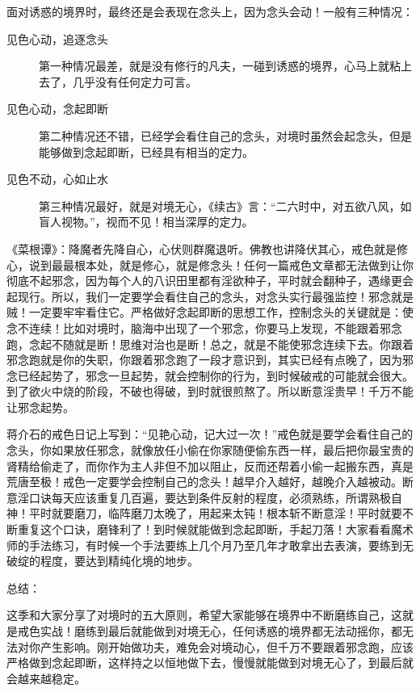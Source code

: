 面对诱惑的境界时，最终还是会表现在念头上，因为念头会动！一般有三种情况：

\begin{description}
    \item[见色心动，追逐念头] 第一种情况最差，就是没有修行的凡夫，一碰到诱惑的境界，心马上就粘上去了，几乎没有任何定力可言。
    \item[见色心动，念起即断] 第二种情况还不错，已经学会看住自己的念头，对境时虽然会起念头，但是能够做到念起即断，已经具有相当的定力。
    \item[见色不动，心如止水] 第三种情况最好，就是对境无心，《续古》言：“二六时中，对五欲八风，如盲人视物。”，视而不见！相当深厚的定力。
\end{description}

《菜根谭》：降魔者先降自心，心伏则群魔退听。佛教也讲降伏其心，戒色就是修心，说到最最根本处，就是修心，就是修念头！任何一篇戒色文章都无法做到让你彻底不起邪念，因为每个人的八识田里都有淫欲种子，平时就会翻种子，遇缘更会起现行。所以，我们一定要学会看住自己的念头，对念头实行最强监控！邪念就是贼！一定要牢牢看住它。严格做好念起即断的思想工作，控制念头的关键就是：使念不连续！比如对境时，脑海中出现了一个邪念，你要马上发现，不能跟着邪念跑，念起不随就是断！思维对治也是断！总之，就是不能使邪念连续下去。你跟着邪念跑就是你的失职，你跟着邪念跑了一段才意识到，其实已经有点晚了，因为邪念已经起势了，邪念一旦起势，就会控制你的行为，到时候破戒的可能就会很大。到了欲火中烧的阶段，不破也得破，到时就很煎熬了。所以断意淫贵早！千万不能让邪念起势。

蒋介石的戒色日记上写到：“见艳心动，记大过一次！”戒色就是要学会看住自己的念头，你如果放任邪念，就像放任小偷在你家随便偷东西一样，最后把你最宝贵的肾精给偷走了，而你作为主人非但不加以阻止，反而还帮着小偷一起搬东西，真是荒唐至极！戒色一定要学会控制自己的念头！越早介入越好，越晚介入越被动。断意淫口诀每天应该重复几百遍，要达到条件反射的程度，必须熟练，所谓熟极自神！平时就要磨刀，临阵磨刀太晚了，用起来太钝！根本斩不断意淫！平时就要不断重复这个口诀，磨锋利了！到时候就能做到念起即断，手起刀落！大家看看魔术师的手法练习，有时候一个手法要练上几个月乃至几年才敢拿出去表演，要练到无破绽的程度，要达到精纯化境的地步。

总结：

这季和大家分享了对境时的五大原则，希望大家能够在境界中不断磨练自己，这就是戒色实战！磨练到最后就能做到对境无心，任何诱惑的境界都无法动摇你，都无法对你产生影响。刚开始做功夫，难免会对境动心，但千万不要跟着邪念跑，应该严格做到念起即断，这样持之以恒地做下去，慢慢就能做到对境无心了，到最后就会越来越稳定。


